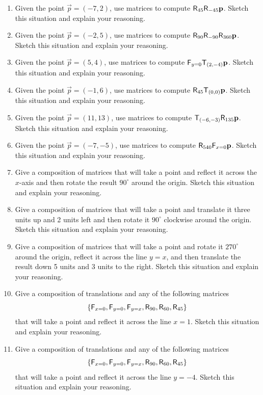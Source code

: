 \begin{problems}
\begin{enumerate}
\item Given the point $\vec{p}=(-7,2)$, use matrices to compute
  $\mathsf{R}_{45}\mathsf{R}_{-45}\mathbf{p}$.  Sketch this situation and
  explain your reasoning.
\item Given the point $\vec{p}=(-2,5)$, use matrices to compute
  $\mathsf{R}_{90}\mathsf{R}_{-90}\mathsf{R}_{360}\mathbf{p}$.  Sketch this
  situation and explain your reasoning.
\item Given the point $\vec{p}=(5,4)$, use matrices to compute
  $\mathsf{F}_{y=0}\mathsf{T}_{(2,-4)}\mathbf{p}$.  Sketch this
  situation and explain your reasoning.
\item Given the point $\vec{p}=(-1,6)$, use matrices to compute
  $\mathsf{R}_{45}\mathsf{T}_{(0,0)}\mathbf{p}$.  Sketch this situation and
  explain your reasoning.
\item Given the point $\vec{p}=(11,13)$, use matrices to  compute
  $\mathsf{T}_{(-6,-3)}\mathsf{R}_{135}\mathbf{p}$.  Sketch this situation and
  explain your reasoning.
\item Given the point $\vec{p}=(-7,-5)$, use matrices to compute
  $\mathsf{R}_{540}\mathsf{F}_{x=0}\mathbf{p}$.  Sketch this situation and
  explain your reasoning.



\item Give a composition of matrices that will take a
  point and reflect it across the $x$-axis and then rotate the result
  $90^\circ$ around the origin. Sketch this situation and
  explain your reasoning.

\item Give a composition of matrices that will take a
  point and translate it three units up and 2 units left and then
  rotate it $90^\circ$ clockwise around the origin. Sketch this situation and
  explain your reasoning.

\item Give a composition of matrices that will take a
  point and rotate it $270^\circ$ around the origin, reflect it across
  the line $y=x$, and then translate the result down 5 units and 3
  units to the right. Sketch this situation and
  explain your reasoning.

\item Give a composition of translations and any of the following matrices
\[
\{\mathsf{F}_{x=0},\mathsf{F}_{y=0}, \mathsf{F}_{y=x}, \mathsf{R}_{90},\mathsf{R}_{60},\mathsf{R}_{45}\}
\]
that will take a point and reflect it across the line $x=1$. Sketch
this situation and explain your reasoning.

\item Give a composition of translations and any of the following
  matrices
\[
\{\mathsf{F}_{x=0},\mathsf{F}_{y=0}, \mathsf{F}_{y=x}, \mathsf{R}_{90},\mathsf{R}_{60},\mathsf{R}_{45}\}
\]
that will take a point and reflect it across the line $y=-4$. Sketch
this situation and explain your reasoning.


\end{enumerate}
\end{problems}
